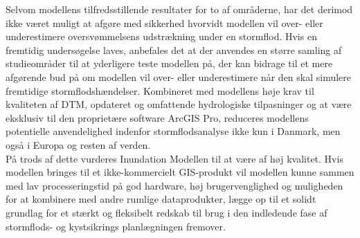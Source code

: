 Selvom modellens tilfredsstillende resultater for to af områderne, har det derimod ikke været muligt at afgøre med sikkerhed hvorvidt modellen vil over- eller underestimere oversvømmelsens udstrækning under en stormflod. Hvis en fremtidig undersøgelse laves, anbefales det at der anvendes en større samling af studieområder til at yderligere teste modellen på, der kan bidrage til et mere afgørende bud på om modellen vil over- eller underestimere når den skal simulere fremtidige stormflodshændelser. Kombineret med modellens høje krav til kvaliteten af DTM, opdateret og omfattende hydrologiske tilpasninger og at være eksklusiv til den proprietære software ArcGIS Pro, reduceres modellens potentielle anvendelighed indenfor stormflodsanalyse ikke kun i Danmark, men også i Europa og resten af verden.\\

På trods af dette vurderes Inundation Modellen til at være af høj kvalitet. Hvis modellen bringes til et ikke-kommercielt GIS-produkt vil modellen kunne sammen med lav processeringstid på god hardware, høj brugervenglighed og muligheden for at kombinere med andre rumlige dataprodukter, lægge op til et solidt grundlag for et stærkt og fleksibelt redskab til brug i den indledende fase af stormflods- og kystsikrings planlægningen fremover.
 

